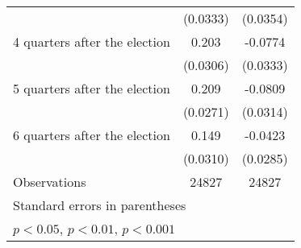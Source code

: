 \begin{table}[htbp]
\begin{tabular}{l*{2}{c}}
                    &    (0.0333)         &    (0.0354)         \\
[1em]
 4 quarters after the election&       0.203\sym{***}&     -0.0774\sym{*}  \\
                    &    (0.0306)         &    (0.0333)         \\
[1em]
 5 quarters after the election&       0.209\sym{***}&     -0.0809\sym{*}  \\
                    &    (0.0271)         &    (0.0314)         \\
[1em]
 6 quarters after the election&       0.149\sym{***}&     -0.0423         \\
                    &    (0.0310)         &    (0.0285)         \\
\hline
Observations        &       24827         &       24827         \\
\hline\hline
\multicolumn{3}{l}{\footnotesize Standard errors in parentheses}\\
\multicolumn{3}{l}{\footnotesize \sym{*} \(p<0.05\), \sym{**} \(p<0.01\), \sym{***} \(p<0.001\)}\\
\end{tabular}
\end{table}
